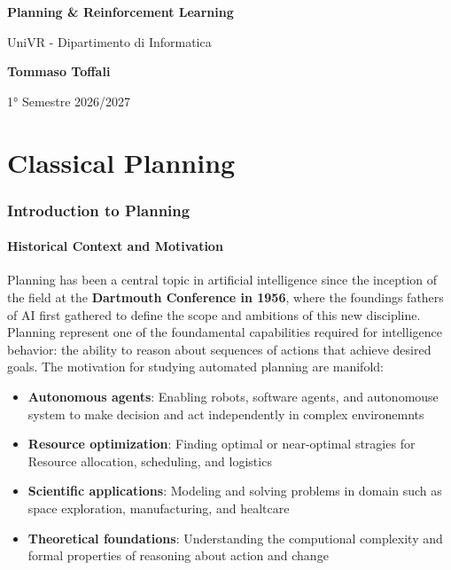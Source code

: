 \documentclass[a4paper]{article}
\theoremstyle{definition}
\begin{document}
\begin{titlepage}
	\begin{center}
		\vspace*{1cm}

		\Huge
		\textbf{Planning \& Reinforcement Learning}

		\vspace{0.5cm}
		\LARGE
		UniVR - Dipartimento di Informatica

		\vspace{1.5cm}

		\textbf{Tommaso Toffali}

		\vfill


		\vspace{0.8cm}


		1° Semestre 2026/2027
    \end{center}
\end{titlepage}

\tableofcontents
\pagebreak
\part{Classical Planning}
\section{Introduction to Planning}
\subsection{Historical Context and Motivation}
Planning has been a central topic in artificial intelligence since the inception
of the field at the \textbf{Dartmouth Conference in 1956}, where the foundings
fathers of AI first gathered to define the scope and ambitions of this new discipline.
Planning represent one of the foundamental capabilities required for intelligence behavior:
the ability to reason about sequences of actions that achieve desired goals.
\vspace{1em}
\noindent
\newline
The motivation for studying automated planning are manifold:
\begin{itemize}
    \item \textbf{Autonomous agents}: Enabling robots, software agents, and autonomouse system 
        to make decision and act independently in complex environemnts
    \item \textbf{Resource optimization}: Finding optimal or near-optimal stragies for Resource
        allocation, scheduling, and logistics
    \item \textbf{Scientific applications}: Modeling and solving problems in domain such as space 
        exploration, manufacturing, and healtcare
    \item \textbf{Theoretical foundations}: Understanding the computional complexity and formal properties
        of reasoning about action and change
\end{itemize}
\end{document}
